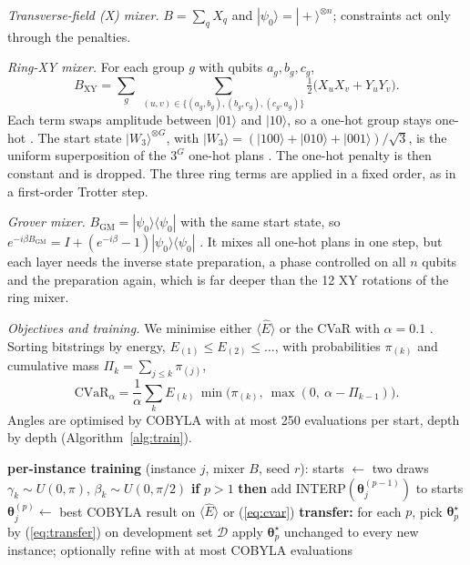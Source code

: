 \documentclass[conference]{IEEEtran}
\begin{document}
\textit{Transverse-field (X) mixer.} $B=\sum_q X_q$ and $|\psi_0\rangle=|+\rangle^{\otimes n}$; constraints act only through the penalties.

\textit{Ring-XY mixer.} For each group $g$ with qubits $a_g,b_g,c_g$,
\begin{equation}
B_{\mathrm{XY}}=\sum_{g}\ \sum_{(u,v)\in\{(a_g,b_g),(b_g,c_g),(c_g,a_g)\}}\tfrac12\big(X_uX_v+Y_uY_v\big).
\label{eq:xy}
\end{equation}
Each term swaps amplitude between $|01\rangle$ and $|10\rangle$, so a one-hot group stays one-hot \cite{WangZ2020}. The start state $|W_3\rangle^{\otimes G}$, with $|W_3\rangle=(|100\rangle+|010\rangle+|001\rangle)/\sqrt3$, is the uniform superposition of the $3^G$ one-hot plans \cite{Bartschi2019}. The one-hot penalty is then constant and is dropped. The three ring terms are applied in a fixed order, as in a first-order Trotter step.

\textit{Grover mixer.} $B_{\mathrm{GM}}=|\psi_0\rangle\langle\psi_0|$ with the same start state, so $e^{-i\beta B_{\mathrm{GM}}}=I+(e^{-i\beta}-1)|\psi_0\rangle\langle\psi_0|$ \cite{Bartschi2020}. It mixes all one-hot plans in one step, but each layer needs the inverse state preparation, a phase controlled on all $n$ qubits and the preparation again, which is far deeper than the 12 XY rotations of the ring mixer.

\textit{Objectives and training.} We minimise either $\langle\hat E\rangle$ or the CVaR with $\alpha=0.1$ \cite{Barkoutsos2020}. Sorting bitstrings by energy, $E_{(1)}\le E_{(2)}\le\dots$, with probabilities $\pi_{(k)}$ and cumulative mass $\Pi_k=\sum_{j\le k}\pi_{(j)}$,
\begin{equation}
\mathrm{CVaR}_\alpha=\frac1\alpha\sum_k E_{(k)}\,\min\!\big(\pi_{(k)},\ \max(0,\ \alpha-\Pi_{k-1})\big).
\label{eq:cvar}
\end{equation}
Angles are optimised by COBYLA \cite{Powell1994} with at most 250 evaluations per start, depth by depth (Algorithm~\ref{alg:train}).

\begin{algorithm}[t]
\caption{Depth-progressive training and angle transfer}
\label{alg:train}
\begin{algorithmic}[1]
\small
\STATE \textbf{per-instance training} (instance $j$, mixer $B$, seed $r$):
\STATE starts $\leftarrow$ two draws $\gamma_k\sim U(0,\pi)$, $\beta_k\sim U(0,\pi/2)$
\STATE \textbf{if} $p>1$ \textbf{then} add INTERP$(\boldsymbol\theta_j^{(p-1)})$ \cite{Zhou2020} to starts
\STATE $\boldsymbol\theta_j^{(p)}\leftarrow$ best COBYLA result on $\langle\hat E\rangle$ or (\ref{eq:cvar})
\ENDFOR
\STATE \textbf{transfer:} for each $p$, pick $\boldsymbol\theta^{\star}_p$ by (\ref{eq:transfer}) on development set $\mathcal{D}$
\STATE apply $\boldsymbol\theta^{\star}_p$ unchanged to every new instance; optionally refine with at most \HoFt{} COBYLA evaluations
\end{algorithmic}
\end{algorithm}
\end{document}
